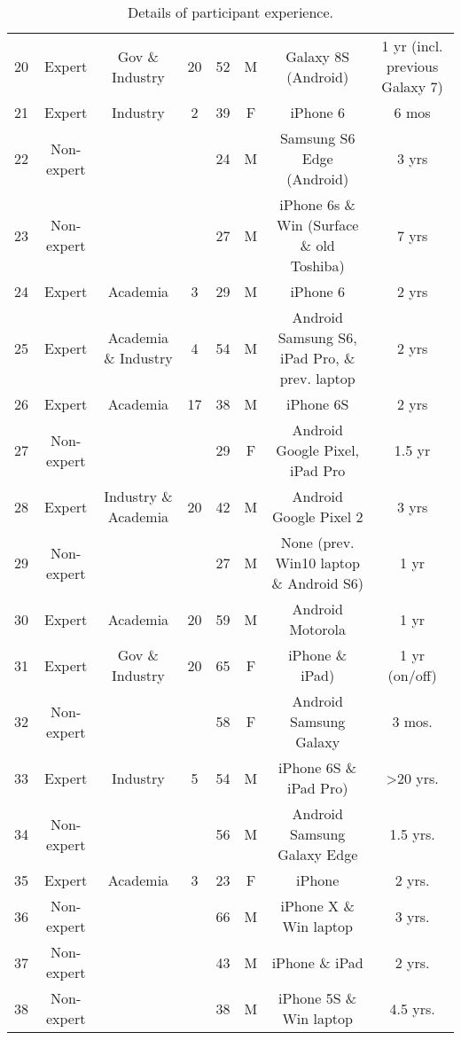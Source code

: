 \begin{table*}[t]
{\begin{tabular}{ c | c | c | c | c | c | c | c  }
20 & Expert & Gov \& Industry & 20 & 52 & M & Galaxy 8S (Android) & 1 yr (incl. previous Galaxy 7)\\
21 & Expert & Industry & 2 & 39 & F & iPhone 6 & 6 mos\\
22 & Non-expert &  &  & 24 & M & Samsung S6 Edge (Android) & 3 yrs\\
23 & Non-expert &  &  & 27 & M & iPhone 6s \& Win (Surface \& old Toshiba) & 7 yrs \\
24 & Expert & Academia & 3 & 29 & M & iPhone 6 & 2 yrs\\
25 & Expert & Academia \& Industry & 4 & 54 & M & Android Samsung S6, iPad Pro, \& prev. laptop & 2 yrs \\
26 & Expert & Academia & 17 & 38 & M & iPhone 6S & 2 yrs \\
27 & Non-expert &  &  & 29 & F & Android Google Pixel, iPad Pro & 1.5 yr \\
28 & Expert & Industry \& Academia & 20 & 42 & M & Android Google Pixel 2 & 3 yrs \\
29 & Non-expert &  &  & 27 & M & None (prev. Win10 laptop \& Android S6) & 1 yr \\
30 & Expert & Academia & 20 & 59 & M & Android Motorola & 1 yr\\
31 & Expert & Gov \& Industry & 20 & 65 & F & iPhone \& iPad) & 1 yr (on/off)\\
32 & Non-expert &  &  & 58 & F & Android Samsung Galaxy & 3 mos.\\
33 & Expert & Industry & 5 & 54 & M & iPhone 6S \& iPad Pro) & >20 yrs. \\
34 & Non-expert &  &  & 56 & M & Android Samsung Galaxy Edge & 1.5 yrs. \\
35 & Expert & Academia & 3 & 23 & F & iPhone & 2 yrs. \\
36 & Non-expert &  &  & 66 & M & iPhone X \& Win laptop & 3 yrs. \\
37 & Non-expert &  &  & 43 & M & iPhone \& iPad & 2 yrs. \\
38 & Non-expert &  &  & 38 & M & iPhone 5S \& Win laptop & 4.5 yrs. \\
\end{tabular}

}
\vspace{.1in} %
  \caption{Details of participant experience.} %
    \label{tab:participantdetails}
\end{table*} 


